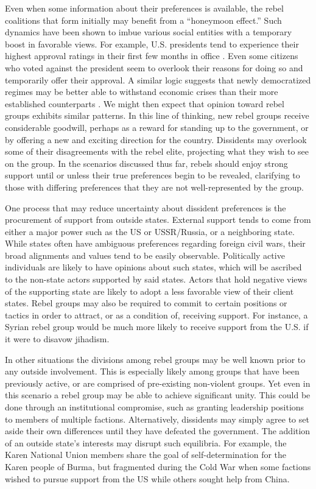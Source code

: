 Even when some information about their preferences is available, the rebel coalitions that form initially may benefit from a ``honeymoon effect.'' Such dynamics have been shown to imbue various social entities with a temporary boost in favorable views. For example, U.S. presidents tend to experience their highest approval ratings in their first few months in office \citep{Erikson2002}. Even some citizens who voted against the president seem to overlook their reasons for doing so and temporarily offer their approval. A similar logic suggests that newly democratized regimes may be better able to withstand economic crises than their more established counterparts \citep{Bernhard2003}. We might then expect that opinion toward rebel groups exhibits similar patterns. In this line of thinking, new rebel groups receive considerable goodwill, perhaps as a reward for standing up to the government, or by offering a new and exciting direction for the country. Dissidents may overlook some of their disagreements with the rebel elite, projecting what they wish to see on the group. In the scenarios discussed thus far, rebels should enjoy strong support until or unless their true preferences begin to be revealed, clarifying to those with differing preferences that they are not well-represented by the group.

One process that may reduce uncertainty about dissident preferences is the procurement of support from outside states. External support tends to come from either a major power such as the US or USSR/Russia, or a neighboring state. While states often have ambiguous preferences regarding foreign civil wars, their broad alignments and values tend to be easily observable. Politically active individuals are likely to have opinions about such states, which will be ascribed to the non-state actors supported by said states. Actors that hold negative views of the supporting state are likely to adopt a less favorable view of their client states. Rebel groups may also be required to commit to certain positions or tactics in order to attract, or as a condition of, receiving support. For instance, a Syrian rebel group would be much more likely to receive support from the U.S. if it were to disavow jihadism.

In other situations the divisions among rebel groups may be well known prior to any outside involvement. This is especially likely among groups that have been previously active, or are comprised of pre-existing non-violent groups. Yet even in this scenario a rebel group may be able to achieve significant unity. This could be done through an institutional compromise, such as granting leadership positions to members of multiple factions. Alternatively, dissidents may simply agree to set aside their own differences until they have defeated the government. The addition of an outside state's interests may disrupt such equilibria. For example, the Karen National Union members share the goal of self-determination for the Karen people of Burma, but fragmented during the Cold War when some factions wished to pursue support from the US while others sought help from China.

